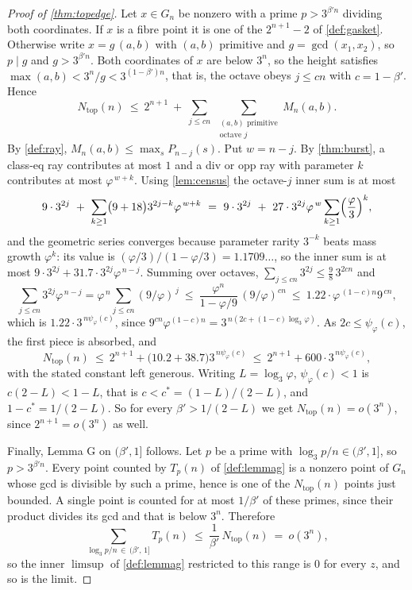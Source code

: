 \documentclass[11pt]{amsart}
\theoremstyle{definition}
\theoremstyle{remark}
\begin{document}
\begin{proof}[Proof of \cref{thm:topedge}]
Let $x \in G_n$ be nonzero with a prime $p > 3^{\beta' n}$ dividing both coordinates. If $x$ is a fibre point it is one of the $2^{n+1}-2$ of \cref{def:gasket}. Otherwise write $x = g\,(a,b)$ with $(a,b)$ primitive and $g = \gcd(x_1,x_2)$, so $p \mid g$ and $g > 3^{\beta' n}$. Both coordinates of $x$ are below $3^n$, so the height satisfies $\max(a,b) < 3^{n}/g < 3^{(1-\beta')n}$, that is, the octave obeys $j \le cn$ with $c = 1-\beta'$. Hence
\[
  N_{\mathrm{top}}(n) \ \le \ 2^{n+1} \ + \ \sum_{j \le cn} \ \sum_{\substack{(a,b) \text{ primitive} \\ \text{octave } j}} M_n(a,b) .
\]
By \cref{def:ray}, $M_n(a,b) \le \max_s P_{n-j}(s)$. Put $w = n-j$. By \cref{thm:burst}, a class-eq ray contributes at most $1$ and a div or opp ray with parameter $k$ contributes at most $\varphi^{\,w+k}$. Using \cref{lem:census} the octave-$j$ inner sum is at most
\[
  9 \cdot 3^{2j} \ + \ \sum_{k \ge 1} \bigl(9 + 18\bigr) 3^{2j-k} \varphi^{\,w+k}
  \ = \ 9 \cdot 3^{2j} \ + \ 27 \cdot 3^{2j} \varphi^{\,w} \sum_{k \ge 1} \Bigl(\frac{\varphi}{3}\Bigr)^{k} ,
\]
and the geometric series converges because parameter rarity $3^{-k}$ beats mass growth $\varphi^{k}$: its value is $(\varphi/3)/(1-\varphi/3) = 1.1709\ldots$, so the inner sum is at most $9 \cdot 3^{2j} + 31.7 \cdot 3^{2j}\varphi^{\,n-j}$. Summing over octaves, $\sum_{j \le cn} 3^{2j} \le \tfrac98 \, 3^{2cn}$ and
\[
  \sum_{j \le cn} 3^{2j} \varphi^{\,n-j} = \varphi^{\,n} \sum_{j \le cn} (9/\varphi)^{\,j}
  \ \le \ \frac{\varphi^{n}}{1 - \varphi/9} \, (9/\varphi)^{cn}
  \ \le \ 1.22 \cdot \varphi^{\,(1-c)n} 9^{\,cn} ,
\]
which is $1.22 \cdot 3^{\,n \psi_\varphi(c)}$,
since $9^{cn}\varphi^{(1-c)n} = 3^{\,n(2c + (1-c)\log_3\varphi)}$. As $2c \le \psi_\varphi(c)$, the first piece is absorbed, and
\[
  N_{\mathrm{top}}(n) \ \le \ 2^{n+1} + \bigl(10.2 + 38.7\bigr) 3^{\,n\psi_\varphi(c)} \ \le \ 2^{n+1} + 600 \cdot 3^{\,n\psi_\varphi(c)} ,
\]
with the stated constant left generous. Writing $L = \log_3\varphi$, $\psi_\varphi(c) < 1$ is $c(2-L) < 1-L$, that is $c < c^* = (1-L)/(2-L)$, and $1 - c^* = 1/(2-L)$. So for every $\beta' > 1/(2-L)$ we get $N_{\mathrm{top}}(n) = o(3^n)$, since $2^{n+1} = o(3^n)$ as well.

Finally, Lemma G on $(\beta',1]$ follows. Let $p$ be a prime with $\log_3 p / n \in (\beta',1]$, so $p > 3^{\beta' n}$. Every point counted by $T_p(n)$ of \cref{def:lemmag} is a nonzero point of $G_n$ whose gcd is divisible by such a prime, hence is one of the $N_{\mathrm{top}}(n)$ points just bounded. A single point is counted for at most $1/\beta'$ of these primes, since their product divides its gcd and that is below $3^n$. Therefore
\[
  \sum_{\log_3 p / n \, \in \, (\beta',\,1]} T_p(n) \ \le \ \frac{1}{\beta'}\, N_{\mathrm{top}}(n) \ = \ o(3^n) ,
\]
so the inner $\limsup$ of \cref{def:lemmag} restricted to this range is $0$ for every $z$, and so is the limit.
\end{proof}
\end{document}
